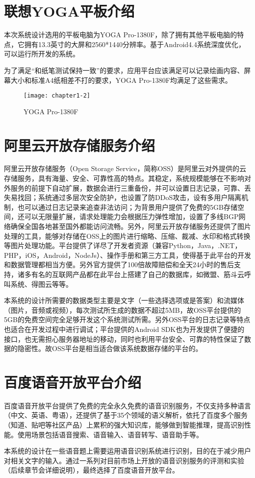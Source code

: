 \section{联想YOGA平板介绍}

本次系统设计选用的平板电脑为YOGA Pro-1380F，除了拥有其他平板电脑的特点，它拥有13.3英寸的大屏和2560*1440分辨率。基于Android4.4系统深度优化，可以运行所开发的系统。

为了满足“和纸笔测试保持一致”的要求，应用平台应该满足可以记录绘画内容、屏幕大小和标准A4纸相差不打的要求，YOGA Pro-1380F均满足了这些需求。

\begin{figure}[h]
  \centering
  \texttt{[image: chapter1-2]}
  \caption{YOGA Pro-1380F}
\end{figure}

\section{阿里云开放存储服务介绍}

阿里云开放存储服务（Open Storage Service，简称OSS）是阿里云对外提供的云存储服务，具有海量、安全、可靠性高的特点。其稳定，系统规模能够在不影响对外服务的前提下自动扩展，数据会进行三重备份，并可以设置日志记录，可靠、丢失易找回；系统通过多层次安全防护，也设置了防DDoS攻击，设有多用户隔离机制，也可以通过日志记录来追查非法访问；为背景用户提供了免费的5GB存储空间，还可以无限量扩展，请求处理能力会根据压力弹性增加，设置了多线BGP网络确保全国各地甚至国外都能访问流畅。另外，阿里云开放存储服务还提供了图片处理的工具，能够对存储在OSS上的图片进行缩略、压缩、裁减、水印和格式转换等图片处理功能。平台提供了详尽了开发者资源（兼容Python，Java，.NET，PHP，iOS，Android，NodeJs）、操作手册和第三方工具，使得基于此平台的开发和数据管理都相当方便。另外官方提供了100倍故障赔偿和全天24小时的售后支持，诸多有名的互联网产品都在此平台上搭建了自己的数据库，如微盟、筋斗云呼叫系统、得图云等等。

本系统的设计所需要的数据类型主要是文字（一些选择选项或是答案）和流媒体（图片，音频或视频），每次测试所生成的数据不超过5MB，故OSS平台提供的5GB的免费空间完全足够开发这个系统测试所需。另外OSS平台的日志记录等特点也适合在开发过程中进行调试；平台提供的Android SDK也为开发提供了便捷的接口，也无需担心服务器地址的移动，同时也利用平台安全、可靠的特性保证了数据的隐密性。故OSS平台是相当适合做该系统数据存储的平台的。

\section{百度语音开放平台介绍}

百度语音开放平台提供了免费的完全永久免费的语音识别服务，不仅支持多种语言（中文、英语、粤语），还提供了基于35个领域的语义解析，依托了百度多个服务（知道、贴吧等社区产品）上累积的强大知识库，能够做到智能推理，提高识别性能。使用场景包括语音搜索、语音输入、语音转写、语音助手等。

本系统的设计在一些语音题上需要运用语音识别系统进行识别，目的在于减少用户对相关文字的输入。通过一系列对目前市场上开放的语音识别服务的评测和实验（后续章节会详细说明），最终选择了百度语音开放平台。


